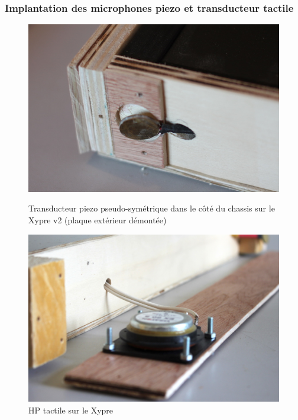 \subsubsection{Implantation des microphones piezo et transducteur tactile}
\begin{figure}[!htbp]
	\captionsetup{format=plain}%
	\centering
	\begin{minipage}[t]{0.48\textwidth}
	    \includegraphics[width=\linewidth]{gfx/05_interfaces/xypre-piezo_72dpi.jpg}
		\caption{Transducteur piezo pseudo-symétrique dans le côté du chassis sur le Xypre v2 (plaque extérieur démontée)}
		\label{fig:interface:xypre_v2-piezo1}
	\end{minipage}
	\hspace{.02\linewidth}
	\begin{minipage}[t]{0.48\textwidth}
	    \includegraphics[width=\linewidth]{gfx/05_interfaces/Xypre_HP_144dpi.jpg}
		\caption{HP tactile sur le Xypre}
		\label{fig:interface:xypre_v2-hp}
	\end{minipage}
\end{figure}
